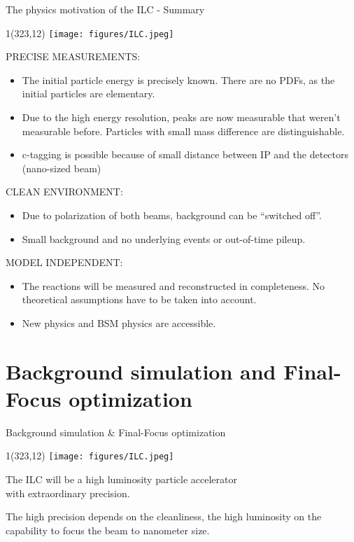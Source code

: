 \documentclass[xcolor={dvipsnames}]{beamer}
\newcommand{\ilclogo}{
  \setlength{\TPHorizModule}{1pt}
  \setlength{\TPVertModule}{1pt}
  \begin{textblock}{1}(323,12)
   \texttt{[image: figures/ILC.jpeg]}
  \end{textblock}
}
\begin{document}
\begin{frame}{The physics motivation of the ILC - Summary}
\ilclogo
\alert{\MakeUppercase{Precise measurements:}}\\
\begin{itemize}
\item The initial particle energy is precisely known. There are no PDFs, as the initial particles are elementary.
\item Due to the high energy resolution, peaks are now measurable that weren't measurable before. Particles with small mass difference are distinguishable.
\item c-tagging is possible because of small distance between IP and the  detectors (nano-sized beam)
\end{itemize}
\alert{\MakeUppercase{Clean environment:}}\\
\begin{itemize}
\item Due to polarization of both beams, background can be ``switched off''.
\item Small background and no underlying events or out-of-time pileup.
\end{itemize}
\alert{\MakeUppercase{Model independent:}}\\
\begin{itemize}
\item The reactions will be measured and reconstructed in completeness. No theoretical assumptions have to be taken into account.
\item New physics and BSM physics are accessible.
\end{itemize}

\end{frame}

\section{Background simulation and Final-Focus optimization}
\begin{frame}{Background simulation \& Final-Focus optimization}
\ilclogo
\begin{block}{}
\centering The ILC will be a \textcolor{Periwinkle}{high luminosity} particle accelerator \\with \textcolor{JungleGreen}{extraordinary precision}.
\end{block}
\vspace*{1cm}
\textcolor{JungleGreen}{The high precision depends on the cleanliness}, \textcolor{Periwinkle}{the high luminosity on the capability to focus the beam to nanometer size}.\\
\vspace*{0.5cm}
\end{frame}
\end{document}
